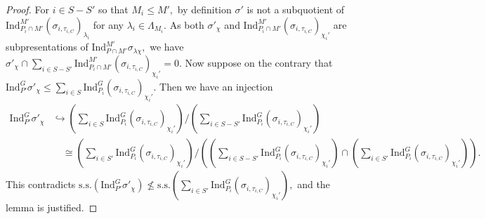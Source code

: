 \documentclass[10pt]{amsart}
\theoremstyle{definition}
\numberwithin{equation}{section}
\numberwithin{equation}{subsection}
\newcommand{\Ind}{\mathrm{Ind}}
\begin{document}
\begin{proof}
    For $i\in S-S'$ so that $M_i\le M',$ by definition $\sigma'$ is not a subquotient of $\Ind_{P_i\cap M'}^{M'} (\sigma_{i,\tau_{i,C}})_{\lambda_i}$ for any $\lambda_i\in \Lambda_{M_i}.$  As both $\sigma'_\chi$ and $\Ind_{P_i\cap M'}^{M'}(\sigma_{i,\tau_{i,C}})_{\chi_i'}$ are subpresentations of $\Ind_{P\cap M'}^{M'} \sigma_{\lambda\chi},$ we have $\sigma'_\chi\cap \sum_{i\in S-S'}\Ind_{P_i\cap M'}^{M'}(\sigma_{i,\tau_{i,C}})_{\chi_i'}=0.$  Now suppose on the contrary that $\mathrm{Ind}_{P'}^G \sigma'_\chi\le  \sum_{i\in S} \mathrm{Ind}_{P_i}^G (\sigma_{i,\tau_{i,C}})_{\chi_i'}.$ Then we have an injection
    \begin{align*}
        \mathrm{Ind}_{P'}^G \sigma'_\chi&\hookrightarrow{} \left( \sum_{i\in S} \mathrm{Ind}_{P_i}^G (\sigma_{i,\tau_{i,C}})_{\chi_i'}\right)\bigg/ \left(\sum_{i\in S-S'} \mathrm{Ind}_{P_i}^G (\sigma_{i,\tau_{i,C}})_{\chi_i'}\right)\\
        &\quad\cong \left( \sum_{i\in S'} \mathrm{Ind}_{P_i}^G (\sigma_{i,\tau_{i,C}})_{\chi_i'}\right)\bigg/ \left(\left(\sum_{i\in S-S'} \mathrm{Ind}_{P_i}^G (\sigma_{i,\tau_{i,C}})_{\chi_i'}\right)\cap \left(\sum_{i\in S'} \mathrm{Ind}_{P_i}^G (\sigma_{i,\tau_{i,C}})_{\chi_i'}\right)\right).
    \end{align*}
    This contradicts $\mathrm{s.s.}\left(\Ind_{P'}^G \sigma'_\chi\right)\not\le \mathrm{s.s.}\left(\sum_{i\in S'} \Ind_{P_i}^G (\sigma_{i,\tau_{i,C}})_{\chi_i'}\right),$ and the lemma is justified. 
\end{proof}
\end{document}
